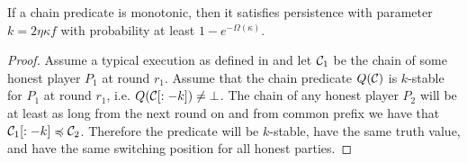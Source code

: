 \begin{theorem}
    If a chain predicate is monotonic, then it satisfies persistence with
    parameter $k = 2\eta \kappa f$ with probability at least $1 -
    e^{-\Omega(\kappa)}$.
\end{theorem}

\begin{proof}
    Assume a typical execution as defined in \cite{backbone} and let $\mathcal{C}_1$
    be the chain of some honest player $P_1$ at round $r_1$. Assume that the
    chain predicate $Q(\mathcal{C})$ is $k$-stable for $P_1$ at round $r_1$, i.e.
    $Q(\mathcal{C}[:-k]) \neq \bot$.  The chain of any honest player $P_2$ will be
    at least as long from the next round on and from common prefix we have that
    $\mathcal{C}_1[:-k] \preccurlyeq \mathcal{C}_2$. Therefore the predicate will be
    $k$-stable, have the same truth value, and have the same switching position
    for all honest parties.
    \Qed
\end{proof}


